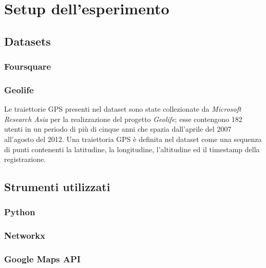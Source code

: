 
\chapter{Setup dell'esperimento} %
\label{Capitolo 3}


\section{Datasets}
\subsection{Foursquare}
\subsection{Geolife}
Le traiettorie GPS presenti nel dataset sono state collezionate da \emph{Microsoft Research Asia} per la realizzazione del progetto \emph{Geolife}; esse contengono 182 utenti in un periodo di pi\`{u} di cinque anni che spazia dall'aprile del 2007 all'agosto del 2012. Una traiettoria GPS \`{e} definita nel dataset come una sequenza di punti contenenti la latitudine, la longitudine, l'altitudine ed il timestamp della registrazione.
\section{Strumenti utilizzati}
\subsection{Python}
\subsection{Networkx}
\subsection{Google Maps API}